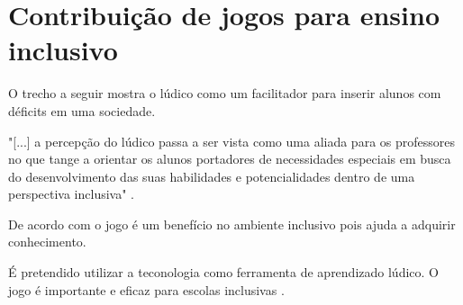 \section[Contribuição de jogos para ensino inclusivo]{Contribuição de jogos para ensino inclusivo}

O trecho a seguir mostra o lúdico como um facilitador para inserir alunos com déficits em uma sociedade. 

"[...] a percepção do lúdico passa a ser vista como uma aliada para os professores no que tange a orientar os alunos portadores de necessidades especiais em busca do desenvolvimento das suas habilidades e potencialidades dentro de uma perspectiva inclusiva"  \cite{jogoPratPedagoc}.

De acordo com \cite{jogoPratPedagoc} o jogo é um benefício no ambiente inclusivo pois ajuda a adquirir conhecimento.

É pretendido utilizar a teconologia como ferramenta de aprendizado lúdico. O jogo é importante e eficaz para escolas inclusivas \cite{jogoPratPedagoc}.

\begin{comment}
Foram anotadas algumas observações sobre os experimentos realizados em estudantes com TDAH para ser lembrado de incluir nos requisitos do jogo para aumentar o público alvo. A seguir alguns itens: 

Crianças com TDAH precisam de um feedback mais frequente. O feedback deve ser apresentado no momento do comportamento visado. Porém o próprio feedback pode causar uma distração, então ele deve ser feito seguido de uma chamada de atenção que redirecione o aluno para a próxima tarefa a ser cumprida (George J. DuPaul, PhD e Gary Stoner, PhD. p. 131-132).

O nível de complexidade das equações e das dificuldades aumentará gradativamente. Para pessoas com TDAH a facilidade em jogar é maior quando inicia-se com instruções iniciais simples e com pouco número de etapas. Para fixar melhor o entendimento do aluno sobre a atividade pede-se que a pessoa repita o que foi pedido como objetivo para completar a atividade. Ao existirem erros em atividade é bom variar as atividades para evitar o cansaço por repetição (George J. DuPaul, PhD e Gary Stoner, PhD. p.132).

Recompensas devem ser dadas para que a motivação aumente. Porém a pessoa deve escolher o prêmio desejado ao invés de ser entregue um prêmio que ela não deseje. Para isso antes da atividade é necessário a fase de negociação para que seja escolhidos possíveis prêmios que sirvam como motivação (George J. DuPaul, PhD e Gary Stoner, PhD. p.133).

\end{comment}


